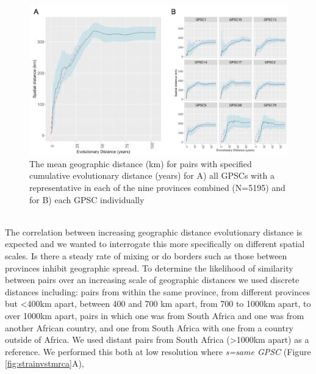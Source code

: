 \documentclass{article}
\begin{document}
\begin{figure}[H]
\centering
    \includegraphics[width=\textwidth]{transrate_AB.png}
    \caption{The mean geographic distance (km) for pairs with specified cumulative evolutionary distance (years) for A) all GPSCs with a representative in each of the nine provinces combined (N=5195) and for B) each GPSC individually}
      \label{fig:transrate}
\end{figure}
\\The correlation between increasing geographic distance evolutionary distance is expected and we wanted to interrogate this more specifically on different spatial scales. Is there a steady rate of mixing or do borders such as those between provinces inhibit geographic spread. To determine the likelihood of similarity between pairs over an increasing scale of geographic distances we used discrete distances including: pairs from within the same province, from different provinces but <400km apart, between 400 and 700 km apart, from 700 to 1000km apart, to over 1000km apart, pairs in which one was from South Africa and one was from another African country, and one from South Africa with one from a country outside of Africa. We used distant pairs from South Africa (>1000km apart) as a reference. We performed this both at low resolution where \textit{s=same GPSC} (Figure \ref{fig:strainvstmrca}A),
\end{document}
